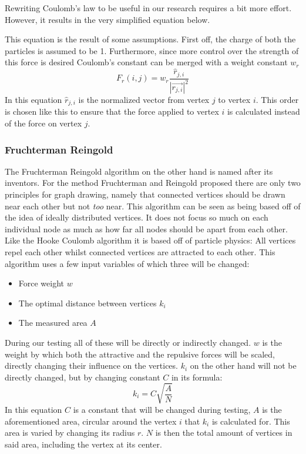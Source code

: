 \documentclass[a4paper,12pt]{article}
\begin{document}
    Rewriting Coulomb's law to be useful in our research requires a bit more effort.
    However, it results in the very simplified equation below.
    
    This equation is the result of some assumptions.
    First off, the charge of both the particles is assumed to be 1.
    Furthermore, since more control over the strength of this force is desired Coulomb's constant can be merged with a weight constant $w_{r}$
    \begin{equation}
      F_{r}(i,j) = w_{r} \frac{\hat{r}_{j,i}}{|\vec{r_{j,i}}|^2}
    \end{equation}
    In this equation $\hat{r}_{j,i}$ is the normalized vector from vertex $j$ to vertex $i$. This order is chosen like this to ensure that the force applied to vertex $i$ is calculated instead of the force on vertex $j$.

    \subsubsection{Fruchterman Reingold}
    The Fruchterman Reingold algorithm on the other hand is named after its inventors.\cite{fruchterman1991graph}
    For the method Fruchterman and Reingold proposed there are only two principles for graph drawing, namely that connected vertices should be drawn near each other but not \emph{too} near.
    This algorithm can be seen as being based off of the idea of ideally distributed vertices.
    It does not focus so much on each individual node as much as how far all nodes should be apart from each other.
    Like the Hooke Coulomb algorithm it is based off of particle physics:
    All vertices repel each other whilst connected vertices are attracted to each other.
    This algorithm uses a few input variables of which three will be changed:
    \begin{itemize}
	  \item Force weight $w$
      \item The optimal distance between vertices $k_{i}$
      \item The measured area $A$
    \end{itemize}
    During our testing all of these will be directly or indirectly changed.
    $w$ is the weight by which both the attractive and the repulsive forces will be scaled, directly changing their influence on the vertices.
    $k_{i}$ on the other hand will not be directly changed, but by changing constant $C$ in its formula:
    \begin{equation}\label{eq:FR_k}
      k_{i} = C \sqrt{\frac{A}{N}}
    \end{equation}
	In this equation $C$ is a constant that will be changed during testing, $A$ is the aforementioned area, circular around the vertex $i$ that $k_i$ is calculated for. This area is varied by changing its radius $r$. $N$ is then the total amount of vertices in said area, including the vertex at its center.
	
\end{document}
